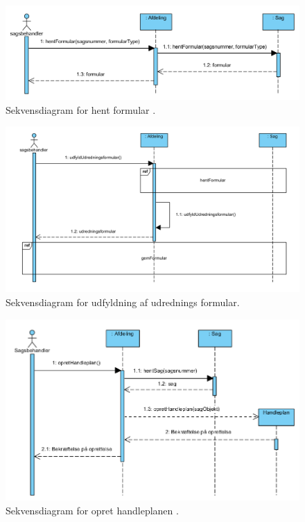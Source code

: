 \begin{figure}
  \includegraphics[width=\linewidth]{./PNG/sekDiaHentFormular.PNG} 
  \caption{Sekvensdiagram for hent formular .}
  \label{fig:HentForm}
\end{figure}

\begin{figure}
  \includegraphics[width=\linewidth]{./PNG/sekDiaUdfyldUdredningsFormular.PNG} 
  \caption{Sekvensdiagram for udfyldning af udrednings formular.}
  \label{fig:UdForm}
\end{figure}

\begin{figure}
  \includegraphics[width=\linewidth]{./PNG/sekDiaOpretHandleplan.PNG} 
  \caption{Sekvensdiagram for opret handleplanen .}
  \label{fig:OpretPlan}
\end{figure}

